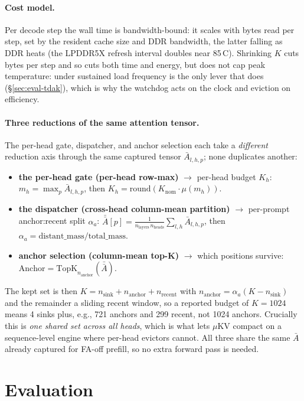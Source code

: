 \documentclass[sigconf, anonymous=false, screen=true]{acmart}
\begin{document}
\paragraph{Cost model.} Per decode step the wall time is bandwidth-bound: it scales with bytes read per step, set by the resident cache size and DDR bandwidth, the latter falling as DDR heats (the LPDDR5X refresh interval doubles near 85\,\textdegree C). Shrinking $K$ cuts bytes per step and so cuts both time and energy, but does not cap peak temperature: under sustained load frequency is the only lever that does (\S\ref{sec:eval-tdak}), which is why the watchdog acts on the clock and eviction on efficiency.
\paragraph{Three reductions of the same attention tensor.} The per-head gate, dispatcher, and anchor selection each take a \emph{different} reduction axis through the same captured tensor $\bar A_{l,h,p}$; none duplicates another:
\begin{itemize}[leftmargin=*, itemsep=2pt]
\item \textbf{the per-head gate (per-head row-max)} $\to$ per-head budget $K_h$: $m_h = \max_p \bar A_{l,h,p}$, then $K_h = \mathrm{round}(K_\text{nom}\cdot\mu(m_h))$.
\item \textbf{the dispatcher (cross-head column-mean partition)} $\to$ per-prompt anchor:recent split $\alpha_a$: $\bar{\bar A}[p] = \frac{1}{n_\text{layers}\,n_\text{heads}}\sum_{l,h} \bar A_{l,h,p}$, then $\alpha_a = \mathrm{distant\_mass}/\mathrm{total\_mass}$.
\item \textbf{anchor selection (column-mean top-K)} $\to$ which positions survive: $\mathrm{Anchor} = \mathrm{TopK}_{n_\text{anchor}}(\bar{\bar A})$.
\end{itemize}
The kept set is then $K = n_\text{sink} + n_\text{anchor} + n_\text{recent}$ with $n_\text{anchor} = \alpha_a(K-n_\text{sink})$ and the remainder a sliding recent window, so a reported budget of $K{=}1024$ means 4 sinks plus, e.g., 721 anchors and 299 recent, not 1024 anchors. Crucially this is \emph{one shared set across all heads}, which is what lets $\mu$KV compact on a sequence-level engine where per-head evictors cannot.
All three share the same $\bar A$ already captured for FA-off prefill, so no extra forward pass is needed.

\section{Evaluation}
\label{sec:eval}
\end{document}
